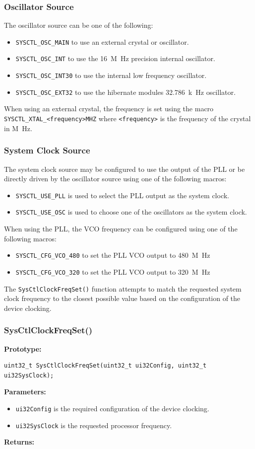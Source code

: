 \documentclass{article}
\begin{document}
\subsubsection{Oscillator Source}
The oscillator source can be one of the following:
\begin{itemize}
    \item \texttt{SYSCTL_OSC_MAIN} to use an external crystal or oscillator.
    \item \texttt{SYSCTL_OSC_INT} to use the \qty{16}{M.Hz} precision internal oscillator.
    \item \texttt{SYSCTL_OSC_INT30} to use the internal low frequency oscillator.
    \item \texttt{SYSCTL_OSC_EXT32} to use the hibernate modules \qty{32.786}{k.Hz} oscillator.
\end{itemize}
When using an external crystal, the frequency is set using the
macro \texttt{SYSCTL_XTAL_<frequency>MHZ} where
\texttt{<frequency>} is the frequency of the crystal in \unit{M.Hz}.
\subsubsection{System Clock Source}
The system clock source may be configured to use the output of the PLL
or be directly driven by the oscillator source using one of the
following macros:
\begin{itemize}
    \item \texttt{SYSCTL_USE_PLL} is used to select the PLL output as the system clock.
    \item \texttt{SYSCTL_USE_OSC} is used to choose one of the oscillators as the system clock.
\end{itemize}
When using the PLL, the VCO frequency can be configured using one of the
following macros:
\begin{itemize}
    \item \texttt{SYSCTL_CFG_VCO_480} to set the PLL VCO output to \qty{480}{M.Hz}
    \item \texttt{SYSCTL_CFG_VCO_320} to set the PLL VCO output to \qty{320}{M.Hz}
\end{itemize}
The \texttt{SysCtlClockFreqSet()} function attempts to match the
requested system clock frequency to the closest possible value based on
the configuration of the device clocking.
\subsubsection{SysCtlClockFreqSet()}
\textbf{Prototype:}
\begin{verbatim}
uint32_t SysCtlClockFreqSet(uint32_t ui32Config, uint32_t ui32SysClock);
\end{verbatim}
\textbf{Parameters:}
\begin{itemize}
    \item \texttt{ui32Config} is the required configuration of the device clocking.
    \item \texttt{ui32SysClock} is the requested processor frequency.
\end{itemize}
\textbf{Returns:}
\medskip
\end{document}

